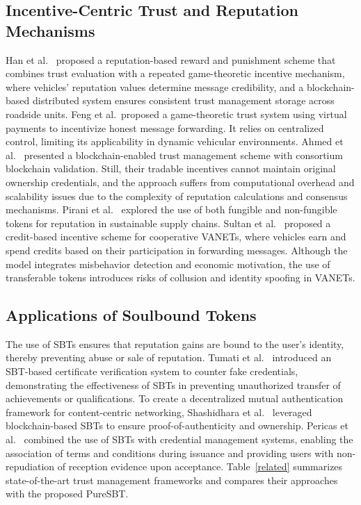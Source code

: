 \cite{cho2010survey}\documentclass[journal,comsoc,twoside]{IEEEtran}
\begin{document}
\subsection{Incentive-Centric Trust and Reputation Mechanisms}
Han et al.~\cite{han} proposed a reputation-based reward and punishment scheme that combines trust evaluation with a repeated game-theoretic incentive mechanism, where vehicles' reputation values determine message credibility, and a blockchain-based distributed system ensures consistent trust management storage across roadside units. Feng et al.~\cite{feng}proposed a game-theoretic trust system using virtual payments to incentivize honest message forwarding. It relies on centralized control, limiting its applicability in dynamic vehicular environments. Ahmed et al.~\cite{ahmed} presented a blockchain-enabled trust management scheme with consortium blockchain validation. Still, their tradable incentives cannot maintain original ownership credentials, and the approach suffers from computational overhead and scalability issues due to the complexity of reputation calculations and consensus mechanisms. Pirani et al.~\cite{cacopardo} explored the use of both fungible and non-fungible tokens for reputation in sustainable supply chains. 
Sultan et al.~\cite{sultan} proposed a credit-based incentive scheme for cooperative VANETs, where vehicles earn and spend credits based on their participation in forwarding messages. Although the model integrates misbehavior detection and economic motivation, the use of transferable tokens introduces risks of collusion and identity spoofing in VANETs. 

\subsection{Applications of Soulbound Tokens}
The use of SBTs ensures that reputation gains are bound to the user’s identity, thereby preventing abuse or sale of reputation. 
Tumati et al.~\cite{tumati} introduced an SBT-based certificate verification system to counter fake credentials, demonstrating the effectiveness of SBTs in preventing unauthorized transfer of achievements or qualifications. 
To create a decentralized mutual authentication framework for content-centric networking, Shashidhara et al.~\cite{shashidhara} leveraged blockchain-based SBTs to ensure proof-of-authenticity and ownership. 
Pericas et al.~\cite{pericas} combined the use of SBTs with credential management systems, enabling the association of terms and conditions during issuance and providing users with non-repudiation of reception evidence upon acceptance. Table~\ref{related} summarizes state-of-the-art trust management frameworks and compares their approaches with the proposed PureSBT.
\end{document}
